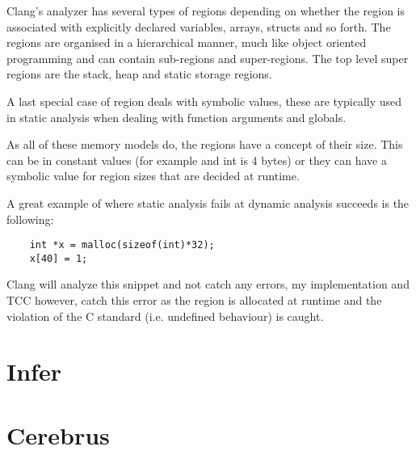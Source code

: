Clang's analyzer has several types of regions depending on whether the region is associated with explicitly declared variables, arrays, structs and so forth. The regions are organised in a hierarchical manner, much like object oriented programming and can contain sub-regions and super-regions. The top level super regions are the stack, heap and static storage regions.

A last special case of region deals with symbolic values, these are typically used in static analysis when dealing with function arguments and globals.

As all of these memory models do, the regions have a concept of their size. This can be in constant values (for example and int is 4 bytes) or they can have a symbolic value for region sizes that are decided at runtime.

A great example of where static analysis fails at dynamic analysis succeeds is the following:
\begin{verbatim}
    int *x = malloc(sizeof(int)*32);
    x[40] = 1;
\end{verbatim}

Clang will analyze this snippet and not catch any errors, my implementation and TCC however, catch this error as the region is allocated at runtime and the violation of the C standard (i.e. undefined behaviour) is caught.





\section{Infer}

\section{Cerebrus}